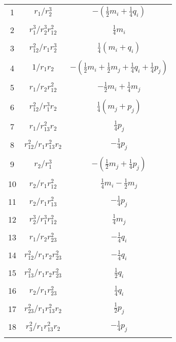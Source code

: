 \documentclass[Dissertation.tex]{subfiles}
\begin{document}
\begin{center}
\begin{longtable}{|c|c|c|}
1  & $r_1/r_2^3$  & $-(\frac{1}{2}m_i + \frac{1}{4}q_i)$ \\
&  &  \\
2  & $r_1^3/r_2^3 r_{12}^2$  & $\frac{1}{4}m_i$ \\
&  &  \\
3  & $r_{12}^2/r_1 r_2^3$  & $\frac{1}{4}(m_i + q_i)$ \\
&  &  \\
4  & $1/r_1 r_2$  & $-(\frac{1}{2}m_i + \frac{1}{2}m_j + \frac{1}{4}q_i + \frac{1}{4}p_j)$ \\
&  &  \\
5  & $r_1/r_2 r_{12}^2$  & $-\frac{1}{2}m_i + \frac{1}{4}m_j$ \\
&  &  \\
6  & $r_{12}^2/r_1^3 r_2$  & $\frac{1}{4}(m_j + p_j)$ \\
&  &  \\
7  & $r_1/r_{13}^2 r_2$  & $\frac{1}{4} p_j$ \\
&  &  \\
8  & $r_{12}^2/r_1 r_{13}^2 r_2$  & $-\frac{1}{4} p_j$ \\
&  &  \\
9  & $r_2/r_1^3$  & $-(\frac{1}{2}m_j + \frac{1}{4}p_j)$ \\
&  &  \\
10  & $r_2/r_1 r_{12}^2$  & $\frac{1}{4} m_i - \frac{1}{2} m_j$ \\
&  &  \\
11  & $r_2/r_1 r_{13}^2$  & $-\frac{1}{4}p_j$ \\
&  &  \\
12  & $r_2^3/r_1^3 r_{12}^2$  & $\frac{1}{4}m_j$ \\
&  &  \\
13  & $r_1/r_2 r_{23}^2$  & $-\frac{1}{4}q_i$ \\
&  &  \\
14  & $r_{12}^2/r_1 r_2 r_{23}^2$  & $-\frac{1}{4}q_i$ \\
&  &  \\
15  & $r_{13}^2/r_1 r_2 r_{23}^2$  & $\frac{1}{2}q_i$ \\
&  &  \\
16  & $r_2/r_1 r_{23}^2$  & $\frac{1}{4}q_i$ \\
&  &  \\
17  & $r_{23}^2/r_1 r_{13}^2 r_2$  & $\frac{1}{2}p_j$ \\
&  &  \\
18  & $r_3^2/r_1 r_{13}^2 r_2$  & $-\frac{1}{4}p_j$ \\
&  &  \\

\end{longtable}
\end{center}
\end{document}
